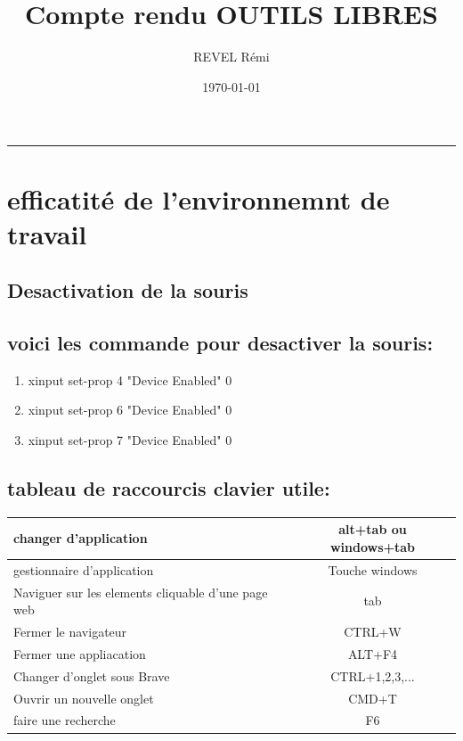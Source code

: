 \documentclass{article}
\title{Compte rendu OUTILS LIBRES}
\author{REVEL Rémi}
\date{\today}
\begin{document}
\maketitle
\par\noindent\rule{\textwidth}{0.4pt}

 
\section{\huge{efficatité de l'environnemnt de travail}}

\subsection{\large{Desactivation de la souris}}

\subsection*{\normalsize{voici les commande pour desactiver la souris:} } 
\begin{enumerate}
    \item xinput set-prop 4 "Device Enabled" 0

    \item xinput set-prop 6 "Device Enabled" 0

    \item xinput set-prop 7 "Device Enabled" 0
\end{enumerate}

\subsection*{\normalsize{tableau de raccourcis clavier utile:} }    

\begin{center}
   \begin{tabular}{| l | c | }
     \hline
     changer d'application & alt+tab ou windows+tab\\ \hline
     gestionnaire d'application & Touche windows \\ \hline
     Naviguer sur les elements cliquable d'une page web & tab   \\ \hline
     Fermer le navigateur & CTRL+W \\ \hline
     Fermer une appliacation & ALT+F4 \\ \hline
     Changer d'onglet sous Brave & CTRL+1,2,3,...   \\ \hline
     Ouvrir un nouvelle onglet & CMD+T \\ \hline
     faire une recherche & F6 \\ \hline
   \end{tabular}
 \end{center}
 
\end{document}
